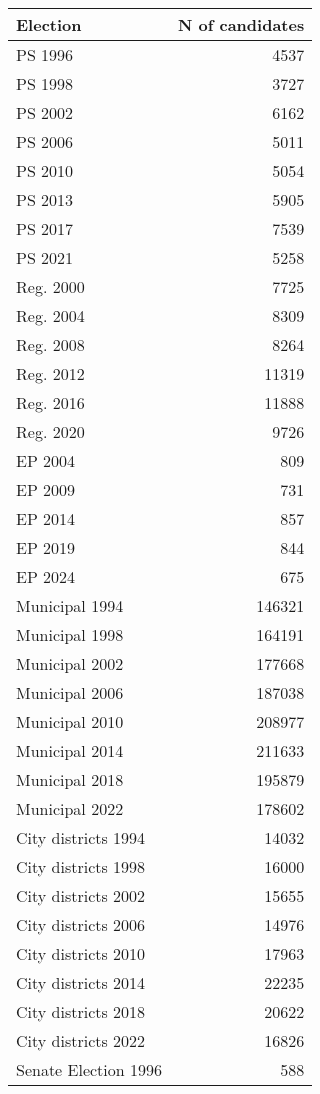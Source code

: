
\begin{tabular}{l|r}
\hline
Election & N of candidates\\
\hline
PS 1996 & 4537\\
\hline
PS 1998 & 3727\\
\hline
PS 2002 & 6162\\
\hline
PS 2006 & 5011\\
\hline
PS 2010 & 5054\\
\hline
PS 2013 & 5905\\
\hline
PS 2017 & 7539\\
\hline
PS 2021 & 5258\\
\hline
Reg. 2000 & 7725\\
\hline
Reg. 2004 & 8309\\
\hline
Reg. 2008 & 8264\\
\hline
Reg. 2012 & 11319\\
\hline
Reg. 2016 & 11888\\
\hline
Reg. 2020 & 9726\\
\hline
EP 2004 & 809\\
\hline
EP 2009 & 731\\
\hline
EP 2014 & 857\\
\hline
EP 2019 & 844\\
\hline
EP 2024 & 675\\
\hline
Municipal 1994 & 146321\\
\hline
Municipal 1998 & 164191\\
\hline
Municipal 2002 & 177668\\
\hline
Municipal 2006 & 187038\\
\hline
Municipal 2010 & 208977\\
\hline
Municipal 2014 & 211633\\
\hline
Municipal 2018 & 195879\\
\hline
Municipal 2022 & 178602\\
\hline
City districts 1994 & 14032\\
\hline
City districts 1998 & 16000\\
\hline
City districts 2002 & 15655\\
\hline
City districts 2006 & 14976\\
\hline
City districts 2010 & 17963\\
\hline
City districts 2014 & 22235\\
\hline
City districts 2018 & 20622\\
\hline
City districts 2022 & 16826\\
\hline
Senate Election 1996 & 588\\

\end{tabular}
